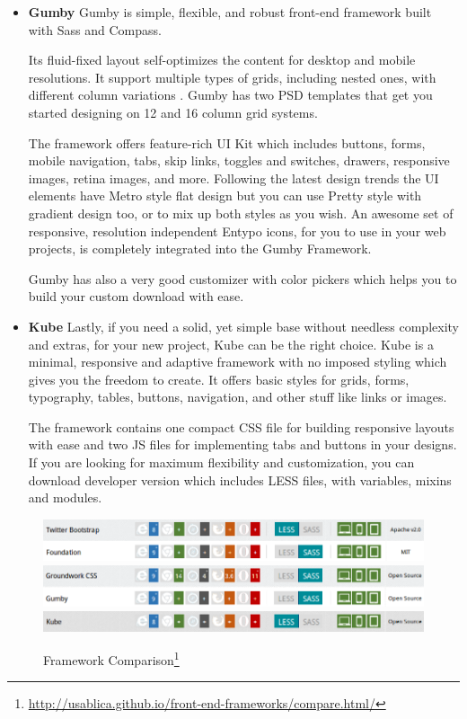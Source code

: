 \begin{itemize}
\item \textbf{Gumby}
\newline
Gumby is simple, flexible, and robust front-end framework built with Sass and Compass.

Its fluid-fixed layout self-optimizes the content for desktop and mobile resolutions. It support multiple types of grids, including nested ones, with different column variations . Gumby has two PSD templates that get you started designing on 12 and 16 column grid systems.

The framework offers feature-rich UI Kit which includes buttons, forms, mobile navigation, tabs, skip links, toggles and switches, drawers, responsive images, retina images, and more. Following the latest design trends the UI elements have Metro style flat design but you can use Pretty style with gradient design too, or to mix up both styles as you wish. An awesome set of responsive, resolution independent Entypo icons, for you to use in your web projects, is completely integrated into the Gumby Framework.

Gumby has also a very good customizer with color pickers which helps you to build your custom download with ease.
\item \textbf{Kube}
\newline
Lastly, if you need a solid, yet simple base without needless complexity and extras, for your new project, Kube can be the right choice. Kube is a minimal, responsive and adaptive framework with no imposed styling which gives you the freedom to create. It offers basic styles for grids, forms, typography, tables, buttons, navigation, and other stuff like links or images.

The framework contains one compact CSS file for building responsive layouts with ease and two JS files for implementing tabs and buttons in your designs. If you are looking for maximum flexibility and customization, you can download developer version which includes LESS files, with variables, mixins and modules.
\end{itemize}

\begin{figure}[!ht]
\centering
\includegraphics[scale=0.7]{images/Bootstrap&Foundation.png}
\includegraphics[scale=0.7]{images/Groundwork&Gumby.png} 
\includegraphics[scale=0.7]{images/Kube.png}  
\caption[Framework Comparison]{Framework Comparison\footnote{\url{http://usablica.github.io/front-end-frameworks/compare.html/}}}
\label{img:Bootstrap&Foundation.png}
\label{img:Groundwork&Gumby.png}   
\label{img:Kube.png}                          
\end{figure}

